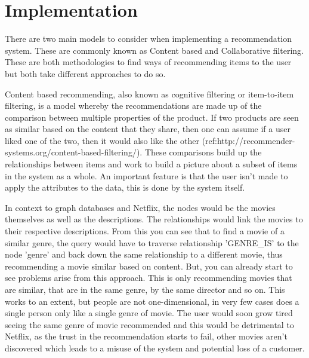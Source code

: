 \documentclass[a4paper]{article}
\begin{document}
\section{Implementation}
\label{sec:Implementation}

There are two main models to consider when implementing a recommendation system. These are commonly known as Content based and Collaborative filtering. These are both methodologies to find ways of recommending items to the user but both take different approaches to do so.

Content based recommending, also known as cognitive filtering or item-to-item filtering, is a model whereby the recommendations are made up of the comparison between multiple properties of the product. If two products are seen as similar based on the content that they share, then one can assume if a user liked one of the two, then it would also like the other (ref:http://recommender-systems.org/content-based-filtering/). These comparisons build up the relationships between items and work to build a picture about a subset of items in the system as a whole. An important feature is that the user isn't made to apply the attributes to the data, this is done by the system itself.

In context to graph databases and Netflix, the nodes would be the movies themselves as well as the descriptions. The relationships would link the movies to their respective descriptions. From this you can see that to find a movie of a similar genre, the query would have to traverse relationship 'GENRE\_IS' to the node 'genre' and back down the same relationship to a different movie, thus recommending a movie similar based on content. But, you can already start to see problems arise from this approach. This is only recommending movies that are similar, that are in the same genre, by the same director and so on. This works to an extent, but people are not one-dimensional, in very few cases does a single person only like a single genre of movie. The user would soon grow tired seeing the same genre of movie recommended and this would be detrimental to Netflix, as the trust in the recommendation starts to fail, other movies aren't discovered which leads to a misuse of the system and potential loss of a customer.
\end{document}
